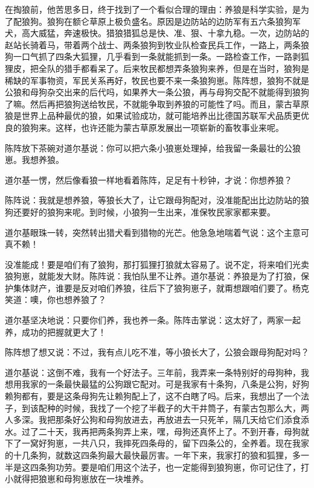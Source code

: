 \par 在掏狼前，他苦思多日，终于找到了一个看似合理的理由：养狼是科学实验，是为了配狼狗。狼狗在额仑草原上极负盛名。原因是边防站的边防军有五六条狼狗军犬，高大威猛，奔速极快。猎狼猎狐总是快、准、狠、十拿九稳。一次，边防站的赵站长骑着马，带着两个战士、两条狼狗到牧业队检查民兵工作，一路上，两条狼狗一口气抓了四条大狐狸，几乎看到一条就能抓到一条。一路检查工作，一路剥狐狸皮，把全队的猎手都看呆了。后来牧民都想弄条狼狗来养，但是在当时，狼狗是稀缺的军事物资，军民关系再好，牧民也要不来一条狼狗崽。陈阵想，狼狗不就是公狼和母狗杂交出来的后代吗，如果养大一条公狼，再与母狗交配不就能得到狼狗了嘛。然后再把狼狗送给牧民，不就能争取到养狼的可能性了吗。而且，蒙古草原狼是世界上品种最优的狼，如果试验成功，就可能培养出比德国苏联军犬品质更优良的狼狗来。这样，也许还能为蒙古草原发展出一项崭新的畜牧事业来呢。
\par 陈阵放下茶碗对道尔基说：你可以把六条小狼崽处理掉，给我留一条最壮的公狼崽。我想养狼。
\par 道尔基一愣，然后像看狼一样地看着陈阵，足足有十秒钟，才说：你想养狼？
\par 陈阵说：我就是想养狼，等狼长大了，让它跟母狗配对，没准能配出比边防站的狼狗还要好的狼狗来呢。到时候，小狼狗一生出来，准保牧民家家都来要。
\par 道尔基眼珠一转，突然转出猎犬看到猎物的光芒。他急急地喘着气说：这个主意可真不赖！
\par 没准能成！要是咱们有了狼狗，那打狐狸打狼就太容易了。说不定，将来咱们光卖狼狗崽，就能发大财。陈阵说：我怕队里不让养。道尔基说：养狼是为了打狼，保护集体财产，谁要是反对咱们养狼，往后下了狼狗崽子，就甭想跟咱们要了。杨克笑道：噢，你也想养狼了？
\par 道尔基坚决地说：只要你们养，我也养一条。陈阵击掌说：这太好了，两家一起养，成功的把握就更大了！
\par 陈阵想了想又说：不过，我有点儿吃不准，等小狼长大了，公狼会跟母狗配对吗？
\par 道尔基说：这倒不难，我有一个好法子。三年前，我弄来一条特别好的母狗种，我想用我家的一条最快最猛的公狗跟它配对。可是我家有十条狗，八条是公狗，好狗赖狗都有，要是这条母狗先让赖狗配上了，这不白瞎了吗。后来，我想出了一个法子，到该配种的时候，我找了一个挖了半截子的大干井筒子，有蒙古包那么大，两人多深。我把那条好公狗和母狗放进去，再放进去一只死羊，隔几天给它们添食添水。过了二十天，我再把两条狗弄上来，嘿，母狗还真怀上了。不到开春，母狗就下了一窝好狗崽，一共八只，我摔死四条母的，留下四条公的，全养着。现在我家的十几条狗，就数这四条狗最大最快最厉害。一年下来，我家打的狼和狐狸，多一半是这四条狗功劳。要是咱们用这个法子，也一定能得到狼狗崽，你可记住了，打小就得把狼崽和母狗崽放在一块堆养。
